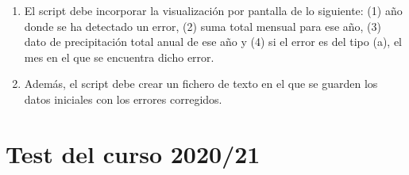 \begin{enumerate}
\begin{enumerate}
\begin{enumerate}
\begin{itemize}
        \end{itemize}
\item El script debe incorporar la visualización por pantalla de lo siguiente: (1) año donde se ha detectado un error, (2) suma total mensual para ese año, (3) dato de precipitación total anual de ese año y (4) si el error es del tipo (a), el mes en el que se encuentra dicho error.

\item Además, el script debe crear un fichero de texto en el que se guarden los datos iniciales con los errores corregidos.
    \end{enumerate}
\end{enumerate}
\end{enumerate}
\section{Test del curso 2020/21}
